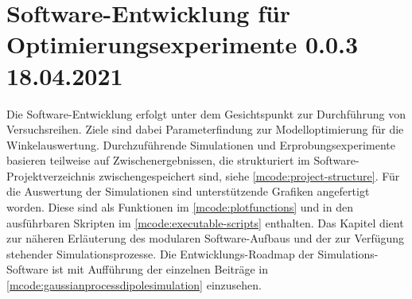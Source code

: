 %

\chapter{Software-Entwicklung für Optimierungsexperimente 0.0.3 18.04.2021}\label{ch:sw-entwicklung-f-opt-exp}


Die Software-Entwicklung erfolgt unter dem Gesichtspunkt zur Durchführung von Versuchsreihen. Ziele sind dabei Parameterfindung zur Modelloptimierung für die Winkelauswertung. Durchzuführende Simulationen und  Erprobungsexperimente basieren teilweise auf Zwischenergebnissen, die strukturiert im Software-Projektverzeichnis zwischengespeichert sind, siehe \autoref{mcode:project-structure}. Für die Auswertung der Simulationen sind unterstützende Grafiken angefertigt worden. Diese sind als Funktionen im \autoref{mcode:plotfunctions} und in den ausführbaren Skripten im \autoref{mcode:executable-scripts} enthalten. Das Kapitel dient zur näheren Erläuterung des modularen Software-Aufbaus und der zur Verfügung stehender Simulationsprozesse. Die Entwicklungs-Roadmap der Simulations-Software ist mit Aufführung der einzelnen Beiträge in \autoref{mcode:gaussianprocessdipolesimulation} einzusehen.



